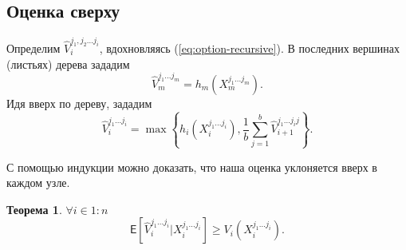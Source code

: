 \documentclass[specialist,
               substylefile = spbu.rtx,
               subf,href,colorlinks=true, 12pt]{disser}
\newtheorem{theorem}{Теорема}
\begin{document}
		\subsection{Оценка сверху}
		\par Определим $\hat{V}_i^{j_1, j_2 \ldots j_i}$, вдохновляясь (\ref{eq:option-recursive}). В последних вершинах (листьях) дерева зададим
		\begin{equation}\label{eq:upper-terminal}
			\hat{V}_m^{j_1 \ldots j_m} = h_m\left(X_m^{j_1 \ldots j_m}\right).
		\end{equation}
		Идя вверх по дереву, зададим
		\begin{equation}\label{eq:upper-node}
			\hat{V}_i^{j_1 \ldots j_i} = \max \left\lbrace h_i \left( X_i^{j_1 \ldots j_i} \right), \frac{1}{b} \sum_{j = 1}^b \hat{V}_{i+1}^{j_1 \ldots j_i j}\right\rbrace .
		\end{equation}
		\par С помощью индукции можно доказать, что наша оценка уклоняется вверх в каждом узле.
		\begin{theorem}
			$\forall i \in 1:n$
			\begin{equation*}
			\mathsf{E}\left[\hat{V}_i^{j_1\ldots j_i}|X_i^{j_1\ldots j_i}\right] \geqslant V_i\left(X_i^{j_1\ldots j_i}\right).
			\end{equation*}
		\end{theorem}
\end{document}
